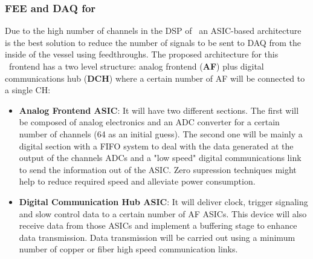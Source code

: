 


 
\subsubsection*{FEE and DAQ for \NHD}

Due to the high number of channels in the DSP of \NHD\ an ASIC-based architecture is the best solution to reduce the number of signals to be sent to DAQ from the inside of the vessel using feedthroughs. The proposed architecture for this \NHD\ frontend has a two level structure: analog frontend ({\bf AF}) plus digital communications hub ({\bf DCH}) where a certain number of AF will be connected to a single CH:
\begin{itemize}
    \item {\bf Analog Frontend ASIC}: It will have two different sections. The first will be composed of analog electronics and an ADC converter for a certain number of channels (64 as an initial guess). The second one will be mainly a digital section with a FIFO system to deal with the data generated at the output of the channels ADCs and a "low speed" digital communications link to send the information out of the ASIC. Zero supression techniques might help to reduce required speed and alleviate power consumption.
    \item {\bf Digital Communication Hub ASIC}: It will deliver clock, trigger signaling and slow control data to a certain number of AF ASICs. This device will also receive data from those ASICs and implement a buffering stage to enhance data transmission. Data transmission will be carried out using a minimum number of copper or fiber high speed communication links.
\end{itemize}

